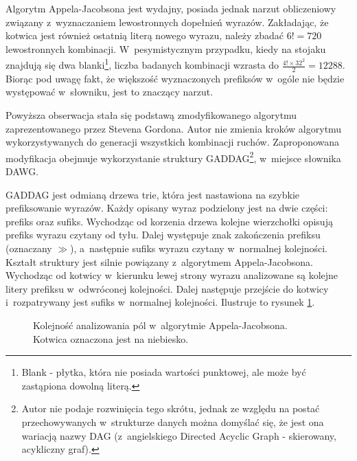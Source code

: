 \documentclass[a4paper,twocolumn,12pt]{article}
\theoremstyle{definition}
\begin{document}
Algorytm Appela-Jacobsona jest wydajny, posiada jednak narzut obliczeniowy związany z~wyznaczaniem lewostronnych dopełnień wyrazów. Zakładając, że kotwica jest również ostatnią literą nowego wyrazu, należy zbadać $6! = 720$ lewostronnych kombinacji. W~pesymistycznym przypadku, kiedy na stojaku znajdują się dwa blanki\footnote{Blank - płytka, która nie posiada wartości punktowej, ale może być zastąpiona dowolną literą.}, liczba badanych kombinacji wzrasta do $\frac{4! \times 32^{2}}{2} = 12288$. Biorąc pod uwagę fakt, że większość wyznaczonych prefiksów w~ogóle nie będzie występować w~słowniku, jest to znaczący narzut.

Powyższa obserwacja stała się podstawą zmodyfikowanego algorytmu zaprezentowanego przez Stevena Gordona. \cite{faster_move_generation_algorithm} Autor nie zmienia kroków algorytmu wykorzystywanych do generacji wszystkich kombinacji ruchów. Zaproponowana modyfikacja obejmuje wykorzystanie struktury GADDAG\footnote{Autor nie podaje rozwinięcia tego skrótu, jednak ze względu na postać przechowywanych w~strukturze danych można domyślać się, że jest ona wariacją nazwy DAG (z~angielskiego Directed Acyclic Graph - skierowany, acykliczny graf).}, w~miejsce słownika DAWG. 

GADDAG jest odmianą drzewa trie, która jest nastawiona na szybkie prefiksowanie wyrazów. Każdy opisany wyraz podzielony jest na dwie części: prefiks oraz sufiks. Wychodząc od korzenia drzewa kolejne wierzchołki opisują prefiks wyrazu czytany od tyłu. Dalej występuje znak zakończenia prefiksu (oznaczany $\gg$), a~następnie sufiks wyrazu czytany w~normalnej kolejności. Kształt struktury jest silnie powiązany z~algorytmem Appela-Jacobsona. Wychodząc od kotwicy w~kierunku lewej strony wyrazu analizowane są kolejne litery prefiksu w~odwróconej kolejności. Dalej następuje przejście do kotwicy i~rozpatrywany jest sufiks w~normalnej kolejności. Ilustruje to rysunek \ref{fig:gaddag_basis}. 

\begin{figure}[ht!]
	\begin{center}
	\end{center}
	\caption{Kolejność analizowania pól w~algorytmie Appela-Jacobsona. Kotwica oznaczona jest na niebiesko.}
	\label{fig:gaddag_basis}
\end{figure}
\end{document}
